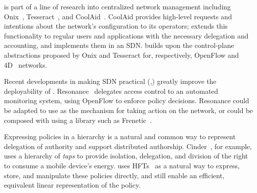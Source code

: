 

%
\sys is part of a line of research into centralized network management including
Onix~\cite{Koponen:2010}, Tesseract~\cite{Tesseract}, and CoolAid~\cite{CoolAid}.
CoolAid provides high-level requests and intentions about the network's configuration
to its operators; \sys extends this functionality to regular users and applications with
the necessary delegation and accounting, and implements them in an SDN.
\sys builds upon the control-plane abstractions proposed by Onix and Tesseract 
for, respectively, OpenFlow and 4D~\cite{Greenberg:2005} networks.

Recent developments in making SDN practical
(\eg,\cite{Gude:2008,McKeown:2008, Voellmy:2011}) greatly improve
the deployability of \sys.  
Resonance~\cite{Nayak:2009} delegates access control to an automated
monitoring system, using OpenFlow to enforce policy decisions.
Resonance could be adapted to use \sys as the mechanism for taking
action on the network, or could be composed with \sys using a
library such as Frenetic~\cite{Foster:2010}.

Expressing policies in a hierarchy is a natural and common way to represent
delegation of authority and support distributed authorship. Cinder~\cite{Roy:2011}, for example, uses a hierarchy of \emph{taps} to provide isolation, delegation, and division of the right to consume
a mobile device's energy.
\sys uses HFTs~\cite{Ferguson:2012b} as a natural way to express, store, and
manipulate these policies
directly, and still enable an efficient, equivalent linear representation of the policy.

